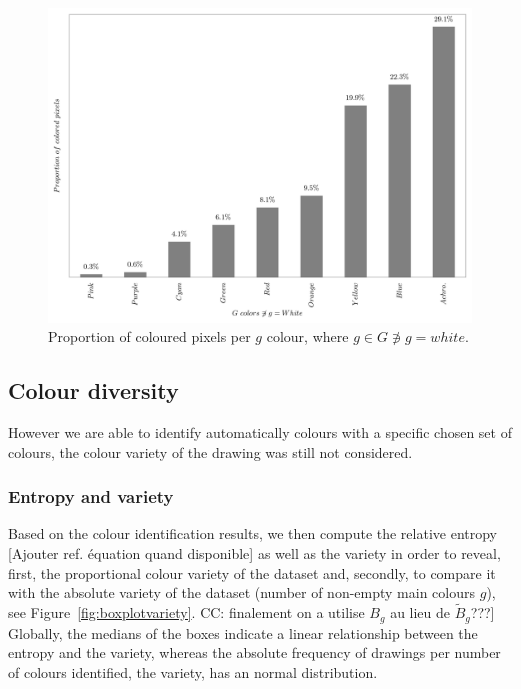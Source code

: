 \documentclass[11pt,a4paper]{article}
\begin{document}
\begin{figure}[h!]
	\centering
	\includegraphics[width=\linewidth]{figures/colors-barplot.png}
	\caption{Proportion of coloured pixels per $g$ colour, where $g \in G \not\ni g = white$.}
	\label{fig:propcolours}
\end{figure}


\subsection{Colour diversity}
\label{sec:results_diversity}
However we are able to identify automatically colours with a specific chosen set of colours, the colour variety of the drawing was still not considered. 

\subsubsection{Entropy and variety}
Based on the colour identification results, we then compute the relative entropy {\color{red}[Ajouter ref. \'equation quand disponible]} as well as the variety in order to reveal, first, the proportional colour variety of the dataset and, secondly, to compare it with the absolute variety of the dataset (number of non-empty main colours $g$), see Figure~\ref{fig:boxplotvariety}. {\color{red} CC: finalement on a utilise $B_{g}$ au lieu de $\tilde{B}_g$???]}
Globally, the medians of the boxes indicate a linear  relationship between the entropy and the variety, whereas the absolute frequency of drawings per number of colours identified, the variety, has an normal distribution.
\end{document}
